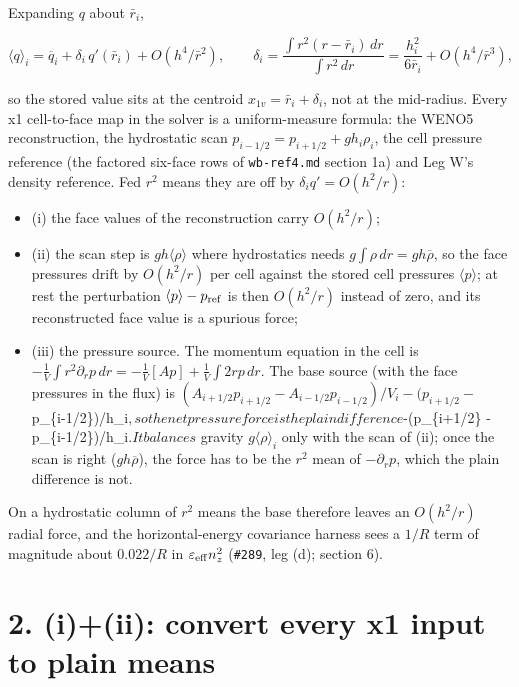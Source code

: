 \documentclass[11pt,a4paper]{article}
\begin{document}
Expanding $q$ about $\bar r_i$,

\begin{equation*}
\langle q\rangle_i = \overline{q}_i + \delta_i\, q'(\bar r_i) + O(h^4/\bar r^2), \qquad
\delta_i = \frac{\int r^2 (r-\bar r_i)\,dr}{\int r^2\,dr} = \frac{h_i^2}{6\bar r_i} + O(h^4/\bar r^3),
\end{equation*}

so the stored value sits at the centroid $x_{1v} = \bar r_i + \delta_i$, not at the mid-radius. Every x1
cell-to-face map in the solver is a uniform-measure formula: the WENO5 reconstruction, the hydrostatic scan
$p_{i-1/2} = p_{i+1/2} + g h_i \rho_i$, the cell pressure reference (the factored six-face rows of \texttt{wb-ref4.md}
section 1a) and Leg W's density reference. Fed $r^2$ means they are off by $\delta_i q' = O(h^2/r)$:

\begin{itemize}
\item (i) the face values of the reconstruction carry $O(h^2/r)$;
\item (ii) the scan step is $g h\langle\rho\rangle$ where hydrostatics needs $g\int\rho\,dr = g h\overline\rho$, so the
  face pressures drift by $O(h^2/r)$ per cell against the stored cell pressures $\langle p\rangle$; at rest the
  perturbation $\langle p\rangle - p_{\rm ref}$ is then $O(h^2/r)$ instead of zero, and its reconstructed face
  value is a spurious force;
\item (iii) the pressure source. The momentum equation in the cell is
  $-\frac{1}{V}\int r^2 \partial_r p\,dr = -\frac{1}{V}[A p] + \frac{1}{V}\int 2 r p\,dr$. The base source
  (with the face pressures in the flux) is $(A_{i+1/2}p_{i+1/2} - A_{i-1/2}p_{i-1/2})/V_i - (p_{i+1/2} -$
  p\_\{i-1/2\})/h\_i$, so the net pressure force is the plain difference $-(p\_\{i+1/2\} - p\_\{i-1/2\})/h\_i$. It balances$
  gravity $g\langle\rho\rangle_i$ only with the scan of (ii); once the scan is right ($g h\overline\rho$), the
  force has to be the $r^2$ mean of $-\partial_r p$, which the plain difference is not.
\end{itemize}

On a hydrostatic column of $r^2$ means the base therefore leaves an $O(h^2/r)$ radial force, and the
horizontal-energy covariance harness sees a $1/R$ term of magnitude about $0.022/R$ in $\varepsilon_{\rm eff} n_z^2$ (\texttt{\#289}, leg (d); section 6).

\section*{2. (i)+(ii): convert every x1 input to plain means}
\end{document}

